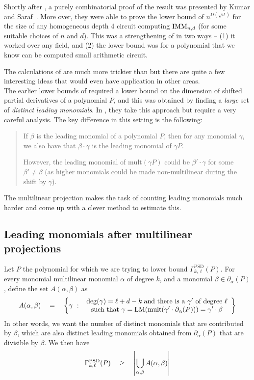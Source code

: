Shortly after \cite{KLSS}, a purely combinatorial proof of the result was presented by Kumar and Saraf~\cite{KS14}. 
More over, they were able to prove the lower bound of $n^{\Omega(\sqrt{d})}$ for the size of any homogeneous depth $4$ circuit computing $\operatorname{\mathrm{IMM}}_{n,d}$ (for some suitable choices of $n$ and $d$). 
This was a strengthening of \cite{KLSS} in two ways -- (1) it worked over any field, and (2) the lower bound was for a polynomial that we know can be computed small arithmetic circuit. 

The calculations of \cite{KS14} are much more trickier than \cite{KLSS} but there are quite a few interesting ideas that would even have application in other areas. \\

The earlier lower bounds of \cite{gkks13,KSS13,FLMS13} required a lower bound on the dimension of shifted partial derivatives of a polynomial $P$, and this was obtained by finding a \emph{large} set of \emph{distinct leading monomials}. 
In \cite{KS14}, they take this approach but require a very careful analysis. 
The key difference in this setting is the following: 

\begin{quote}
  If $\beta$ is the leading monomial of a polynomial $P$, then for any monomial $\gamma$, we also have that $\beta \cdot \gamma$ is the leading monomial of $\gamma P$. 

  However, the leading monomial of $\mathrm{mult}(\gamma P)$ could be $\beta' \cdot \gamma$ for some $\beta' \neq \beta$ (as higher monomials could be made non-multilinear during the shift by $\gamma$). 
\end{quote}

The multilinear projection makes the task of counting leading monomials much harder and \cite{KS14} come up with a clever method to estimate this. 

\subsection*{Leading monomials after multilinear projections}

Let $P$ the polynomial for which we are trying to lower bound $\Gamma^{\mathrm{PSD}}_{k,\ell}(P)$. 
For every monomial multilinear monomial $\alpha$ of degree $k$, and a monomial $\beta \in \partial_\alpha(P)$, define the set $A(\alpha, \beta)$ as
\[
A(\alpha, \beta) \quad = \quad \left\{{\gamma}\ : \ {\begin{array}{c}\deg(\gamma) = \ell + d - k\;\text{and there is a $\gamma'$ of degree $\ell$}\\\text{such that }\gamma  = \mathrm{LM}(\mathrm{mult}(\gamma' \cdot \partial_\alpha(P))) = \gamma' \cdot \beta \end{array}}\right\}
\]
In other words, we want the number of distinct monomials that are contributed by $\beta$, which are also distinct leading monomials obtained from $\partial_\alpha(P)$ that are divisible by $\beta$. 
We then have
\begin{equation*}
\Gamma^{\mathrm{PSD}}_{k,\ell}(P) \quad \geq \quad \left|\bigcup_{\alpha, \beta} A(\alpha, \beta)\right|
\end{equation*}

